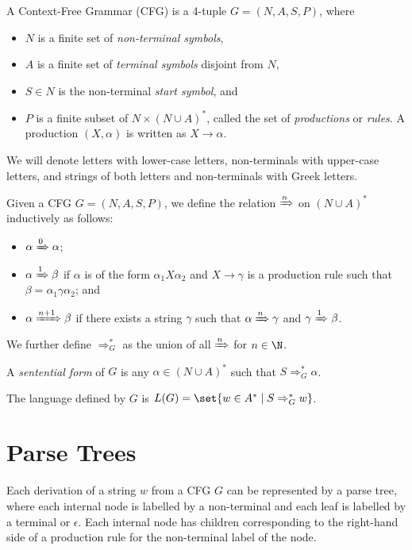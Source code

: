 \begin{definition*} \label{def:cfg}
    A Context-Free Grammar (CFG) is a 4-tuple $G = (N, A, S, P)$, where
    \begin{itemize}
        \item $N$ is a finite set of \emph{non-terminal symbols},
        \item $A$ is a finite set of \emph{terminal symbols}
        disjoint from $N$,
        \item $S \in N$ is the non-terminal \emph{start symbol}, and
        \item $P$ is a finite subset of $N \times (N \cup A)^*$,
        called the set of \emph{productions} or \emph{rules}.
        A production $(X, \alpha)$ is written as $X \to \alpha$.
    \end{itemize}
\end{definition*}
\begin{notation}
    We will denote letters with lower-case letters, non-terminals with
    upper-case letters, and strings of both letters and non-terminals with
    Greek letters.
\end{notation}
\begin{definition} %
    Given a CFG $G = (N, A, S, P)$, we define the relation $\xRightarrow{n}$
    on $(N \cup A)^*$ inductively as follows:
    \begin{itemize}
        \item $\alpha \xRightarrow{0} \alpha$;
        \item $\alpha \xRightarrow{1} \beta$ if $\alpha$ is of the form
        $\alpha_1 X \alpha_2$ and $X \to \gamma$ is a production rule such
        that $\beta = \alpha_1 \gamma \alpha_2$; and
        \item $\alpha \xRightarrow{n+1} \beta$ if there exists a string
        $\gamma$ such that $\alpha \xRightarrow{n} \gamma$ and
        $\gamma \xRightarrow{1} \beta$.
    \end{itemize}
    We further define $\Rightarrow^*_G$ as the union of all
    $\xRightarrow{n}$ for $n \in \N$.

    A \emph{sentential form} of $G$ is any $\alpha \in (N \cup A)^*$ such
    that $S \Rightarrow^*_G \alpha$.

    The language defined by $G$ is
    $L(G) = \set{w \in A^* \mid S \Rightarrow^*_G w}$.
\end{definition}

\section{Parse Trees} \label{sec:cfg:parse_trees}
Each derivation of a string $w$ from a CFG $G$ can be represented by a
parse tree, where each internal node is labelled by a non-terminal and
each leaf is labelled by a terminal or $\epsilon$.
Each internal node has children corresponding to the right-hand side of
a production rule for the non-terminal label of the node.

